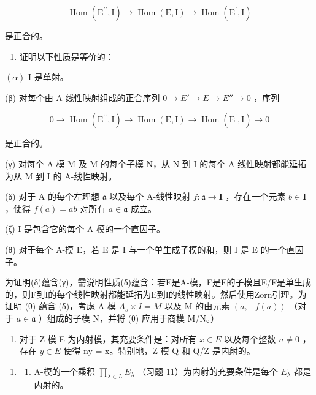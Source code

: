 \[
\operatorname{Hom} \left(\mathrm{E} ^ {\prime \prime}, \mathrm{I}\right)\rightarrow \operatorname{Hom} (\mathrm{E}, \mathrm{I}) \rightarrow \operatorname{Hom} \left(\mathrm{E} ^ {\prime}, \mathrm{I}\right)
\]

是正合的。

\begin{enumerate}
\def\labelenumi{(\alph{enumi})}
\tightlist
\item
  证明以下性质是等价的：
\end{enumerate}

\((\alpha)\) I 是单射。

(β) 对每个由 A-线性映射组成的正合序列 \(0 \rightarrow E' \rightarrow E \rightarrow E'' \rightarrow 0\) ，序列

\[
0 \rightarrow \operatorname{Hom} (\mathrm{E} ^ {\prime \prime}, \mathrm{I}) \rightarrow \operatorname{Hom} (\mathrm{E}, \mathrm{I}) \rightarrow \operatorname{Hom} (\mathrm{E} ^ {\prime}, \mathrm{I}) \rightarrow 0
\]

是正合的。

(γ) 对每个 A-模 M 及 M 的每个子模 N，从 N 到 I 的每个 A-线性映射都能延拓为从 M 到 I 的 A-线性映射。

(δ) 对于 A 的每个左理想 \(\mathfrak{a}\) 以及每个 A-线性映射 \(f: \mathfrak{a} \to \mathbf{I}\) ，存在一个元素 \(b \in \mathbf{I}\) ，使得 \(f(a) = ab\) 对所有 \(a \in \mathfrak{a}\) 成立。

(ζ) I 是包含它的每个 A-模的一个直因子。

(θ) 对于每个 A-模 E，若 E 是 I 与一个单生成子模的和，则 I 是 E 的一个直因子。

为证明(δ)蕴含(γ)，需说明性质(δ)蕴含：若E是A-模，F是E的子模且E/F是单生成的，则F到I的每个线性映射都能延拓为E到I的线性映射。然后使用Zorn引理。为证明 (θ) 蕴含 (δ)，考虑 A-模 \(A_{s} \times I = M\) 以及 M 的由元素 \((a, -f(a))\) （对于 \(a \in \mathfrak{a}\) ）组成的子模 N，并将 (θ) 应用于商模 M/N。）

\begin{enumerate}
\def\labelenumi{(\alph{enumi})}
\setcounter{enumi}{1}
\tightlist
\item
  对于 Z-模 E 为内射模，其充要条件是：对所有 \(x \in E\) 以及每个整数 \(n \neq 0\) ，存在 \(y \in E\) 使得 ny = x。特别地，Z-模 Q 和 Q/Z 是内射的。
\end{enumerate}

\begin{enumerate}
\def\labelenumi{\arabic{enumi}.}
\setcounter{enumi}{11}
\tightlist
\item
  \begin{enumerate}
  \def\labelenumii{(\alph{enumii})}
  \tightlist
  \item
    A-模的一个乘积 \(\prod_{\lambda \in L} E_{\lambda}\) （习题 11）为内射的充要条件是每个 \(E_{\lambda}\) 都是内射的。
  \end{enumerate}
\end{enumerate}

